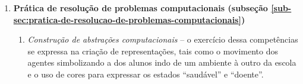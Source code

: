 \begin{enumerate}
  \item \textbf{Prática de resolução de problemas computacionais (subseção \ref{sub-sec:pratica-de-resolucao-de-problemas-computacionais})} 
  
  \begin{enumerate}
    \item \textit{Construção de abstrações computacionais} -- o exercício dessa competências se expressa na criação de representações, tais como o movimento dos agentes simbolizando a dos alunos indo de um ambiente à outro da escola e o uso de cores para expressar os estados ``saudável'' e ``doente''.
  \end{enumerate}
\end{enumerate}

